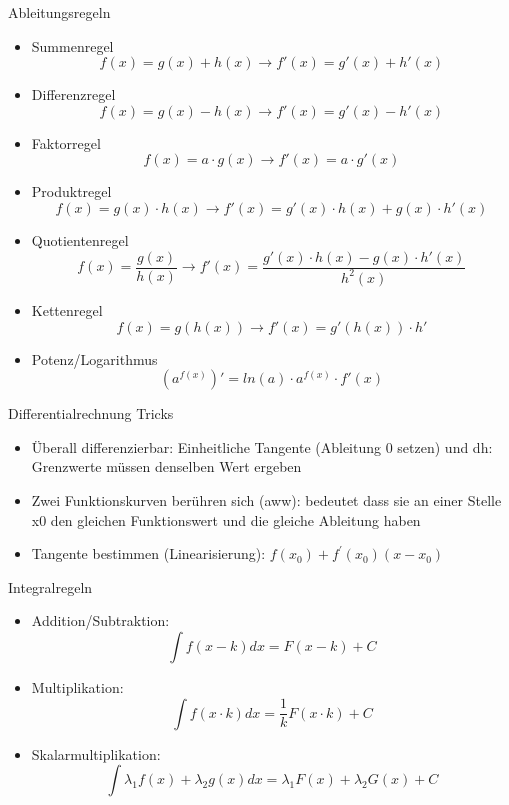 \raggedcolumns
\columnbreak

    \begin{concept}{Ableitungsregeln}
        \begin{itemize}
        \item Summenregel
            \[f(x)=g(x)+h(x) \rightarrow f'(x)=g'(x)+h'(x) \]
        \item Differenzregel
            \[f(x)= g(x) - h(x) \rightarrow f'(x) = g'(x) - h'(x) \]
        \item Faktorregel 
            \[f(x)=a\cdot g(x) \rightarrow f'(x)=a \cdot g'(x) \]
        \item Produktregel
            \[f(x)=g(x)\cdot h(x) \rightarrow f'(x)=g'(x)\cdot h(x) + g(x) \cdot h'(x) \]
        \item Quotientenregel 
            \[f(x)=\frac{g(x)}{h(x)} \rightarrow f'(x)=\frac{g'(x)\cdot h(x)-g(x)\cdot
            h'(x)}{h^2(x)}\]
        \item Kettenregel
            \[f(x)=g(h(x)) \rightarrow f'(x)=g'(h(x))\cdot h'\]
        \item Potenz/Logarithmus 
            $$(a^{f(x)})' = ln(a) \cdot a^{f(x)} \cdot f'(x)$$
        \end{itemize}
    \end{concept}


    \begin{KR}{Differentialrechnung Tricks}
        \begin{itemize}
      \item Überall differenzierbar: Einheitliche Tangente (Ableitung 0 setzen) und dh: Grenzwerte müssen denselben Wert ergeben
      \item Zwei Funktionskurven berühren sich (aww): bedeutet dass sie an einer Stelle x0 den gleichen Funktionswert und die gleiche Ableitung haben
      \item Tangente bestimmen (Linearisierung): $f\left(x_{0}\right)+f^{\prime}\left(x_{0}\right)\left(x-x_{0}\right)$
    \end{itemize}
    \end{KR}


\begin{concept}{Integralregeln}
    \begin{itemize}
      \item Addition/Subtraktion:
      $$\int f(x-k) d x=F(x-k)+C$$
      \item Multiplikation:
      $$\int f(x \cdot k) d x=\frac{1}{k} F(x \cdot k)+C$$
      \item Skalarmultiplikation:
      $$\int \lambda_{1} f(x)+\lambda_{2} g(x) d x=\lambda_{1} F(x)+\lambda_{2} G(x)+C$$
    \end{itemize}
\end{concept}



